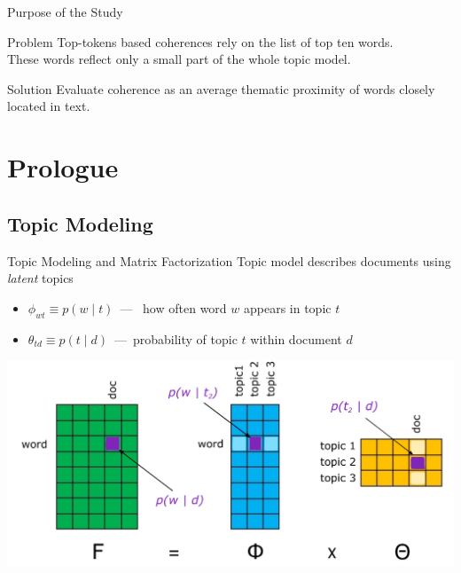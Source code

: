 \documentclass[russian]{beamer}
\begin{document}
\begin{frame}{Purpose of the Study}
  \begin{block}{Problem}
    Top-tokens based coherences rely on the list of top ten words.\\
    These words reflect only a small part of the whole topic model.
  \end{block}
  \begin{block}{Solution}
    Evaluate coherence as an average thematic proximity of words closely located in text.
  \end{block}
\end{frame}

\section{Prologue}


\subsection{Topic Modeling}


\begin{frame}{Topic Modeling and Matrix Factorization}
  Topic model describes documents using \emph{latent} topics
  \smallskip
  
  \begin{itemize}
    \item $\phi_{wt} \equiv p(w \mid t)$~---~ how often word $w$ appears in topic $t$
    \item $\theta_{td} \equiv p(t \mid d)$~---~probability of topic $t$ within document $d$
  \end{itemize}
  
  \centering
  \includegraphics[width=\textwidth]{murat_plsa.eps}\\

\end{frame}
\end{document}
